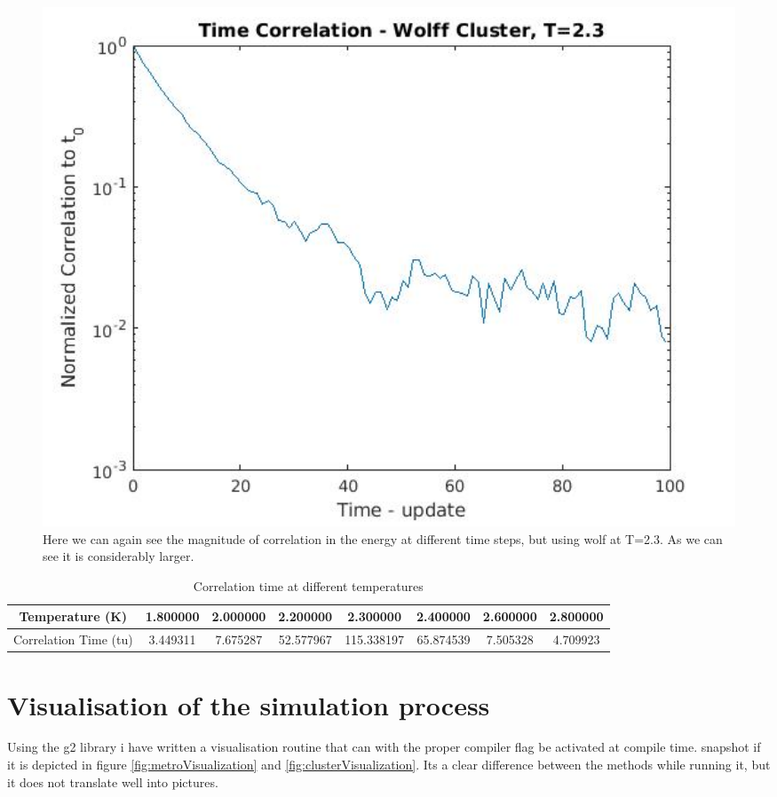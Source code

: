 \documentclass[11pt]{article}
\begin{document}
\begin{figure}[H]
	\centering
	\includegraphics[width=1\textwidth]{../../plots/timeCorrWolf}
	\caption{Here we can again see the magnitude of correlation in the energy at different time steps, but using wolf at T=2.3. As we can see it is considerably larger.}
	\label{fig:timeCorrWolf}
\end{figure}


\begin{table}[h]
  \caption{Correlation time at different temperatures}
  \begin{tabular}{| c | c c c c c c c|}
  \hline
	Temperature (K) & 1.800000 & 2.000000 & 2.200000 & 2.300000 & 2.400000 & 2.600000 & 2.800000\\
	\hline
	Correlation Time (tu) & 3.449311 & 7.675287 & 52.577967 & 115.338197 & 65.874539 & 7.505328 & 4.709923\\
	\hline
  \end{tabular}
  \label{table:timeCorr}
\end{table}

\section{Visualisation of the simulation process}
Using the g2 library i have written a visualisation routine that can with the proper compiler flag be activated at compile time. snapshot if it is depicted in figure \ref{fig:metroVisualization} and \ref{fig:clusterVisualization}. Its a clear difference between the methods while running it, but it does not translate well into pictures. 
\end{document}
